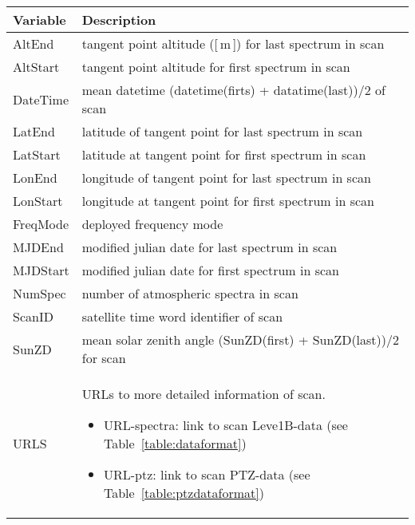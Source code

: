 \begin{table}
\caption{ Odin scan log data format. Latitudes and longitudes are given as geodetic
coordinates using WGS84 reference ellipsoid. Example URL
\url{http://malachite.rss.chalmers.se/rest_api/v4/freqmode_info/2015-01-03/AC1/2/}}
\label{table:logdataformat}
\begin{longtable}{| p{} | p{} |}
\hline
  \textbf{Variable} & \textbf{Description} \\
  \hline
    AltEnd                & tangent point altitude ([\,m\,]) for last spectrum in scan \\ \hline
    AltStart              & tangent point altitude for first spectrum in scan \\ \hline
    DateTime              & mean datetime (datetime(firts) + datatime(last))/2 of scan \\ \hline
    LatEnd                & latitude of tangent point for last spectrum in scan \\ \hline
    LatStart              & latitude at tangent point for first spectrum in scan \\ \hline
    LonEnd                & longitude of tangent point for last spectrum in scan \\ \hline
    LonStart              & longitude at tangent point for first spectrum in scan \\ \hline
    FreqMode              & deployed frequency mode \\ \hline
    MJDEnd                & modified julian date for last spectrum in scan \\ \hline
    MJDStart              & modified julian date for first spectrum in scan \\ \hline
    NumSpec               & number of atmospheric spectra in scan \\ \hline
    ScanID                & satellite time word identifier of scan\\ \hline
    SunZD                 & mean solar zenith angle  (SunZD(first) + SunZD(last))/2 for scan\\ \hline
    URLS                  & URLs to more detailed information of scan. 
                            \begin{itemize}
                             \item URL-spectra: link to scan Leve1B-data (see Table~\ref{table:dataformat})
                             \item URL-ptz:  link to scan PTZ-data (see Table~\ref{table:ptzdataformat})

\end{itemize}
\end{longtable}
\end{table}
